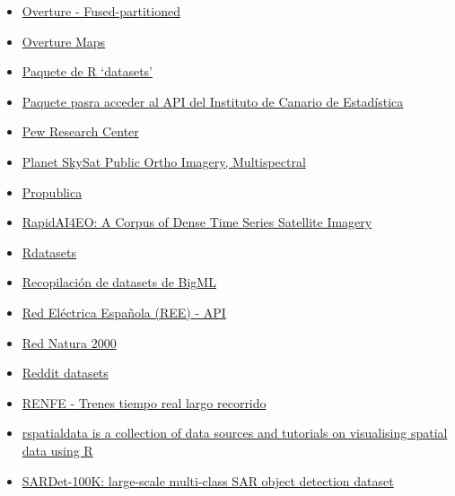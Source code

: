 \documentclass[
  letterpaper,
  DIV=11,
  numbers=noendperiod]{scrartcl}
\begin{document}
\begin{itemize}
  \href{https://www.nature.com/articles/s41597-024-04046-w}{Paper} -
  Classification of 67,705,475 buildings across the United States into
  residential and non-residential
\item
  \href{https://beta.source.coop/repositories/fused/overture/description/}{Overture
  - Fused-partitioned}
\item
  \href{https://github.com/OvertureMaps/data}{Overture Maps}
\item
  \href{http://stat.ethz.ch/R-manual/R-patched/library/datasets/html/00Index.html}{Paquete
  de R `datasets'}
\item
  \href{https://github.com/rOpenSpain/istacbaser}{Paquete pasra acceder
  al API del Instituto de Canario de Estadística}
\item
  \href{https://www.pewresearch.org/download-datasets/}{Pew Research
  Center}
\item
  \href{https://developers.google.com/earth-engine/datasets/catalog/SKYSAT_GEN-A_PUBLIC_ORTHO_MULTISPECTRAL}{Planet
  SkySat Public Ortho Imagery, Multispectral}
\item
  \href{https://www.propublica.org/data/}{Propublica}
\item
  \href{https://beta.source.coop/repositories/planet/rapidai4eo/description/}{RapidAI4EO:
  A Corpus of Dense Time Series Satellite Imagery}
\item
  \href{https://vincentarelbundock.github.io/Rdatasets/articles/data.html}{Rdatasets}
\item
  \href{https://blog.bigml.com/list-of-public-data-sources-fit-for-machine-learning/}{Recopilación
  de datasets de BigML}
\item
  \href{https://www.ree.es/es/apidatos}{Red Eléctrica Española (REE) -
  API}
\item
  \href{https://www.miteco.gob.es/es/biodiversidad/servicios/banco-datos-naturaleza/informacion-disponible/rednatura2000_descargas.html}{Red
  Natura 2000}
\item
  \href{https://www.reddit.com/r/datasets/}{Reddit datasets}
\item
  \href{https://tiempo-real.largorecorrido.renfe.com/}{RENFE - Trenes
  tiempo real largo recorrido}
\item
  \href{https://rspatialdata.github.io/}{rspatialdata is a collection of
  data sources and tutorials on visualising spatial data using R}
\item
  \href{https://eod-grss-ieee.com/dataset-detail/U1dJZE1BY1RwclAvOFFJQmlKR1Btdz09}{SARDet-100K:
  large-scale multi-class SAR object detection dataset}

\end{itemize}
\end{document}
